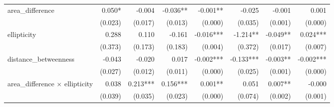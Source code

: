 \begin{tabular}{lrrrrrrr}
area\_difference                           &                       0.050* &                     -0.004 &                     -0.036** &                         -0.001** &                         -0.025 &                                                            -0.001 &                                               0.001 \\ 
                                           &                      (0.023) &                    (0.017) &                      (0.013) &                          (0.000) &                        (0.035) &                                                           (0.001) &                                             (0.000) \\ 
ellipticity                                &                        0.288 &                      0.110 &                       -0.161 &                        -0.016*** &                       -1.214** &                                                          -0.049** &                                            0.024*** \\ 
                                           &                      (0.373) &                    (0.173) &                      (0.183) &                          (0.004) &                        (0.372) &                                                           (0.017) &                                             (0.007) \\ 
distance\_betweenness                      &                       -0.043 &                     -0.020 &                        0.017 &                        -0.002*** &                      -0.133*** &                                                          -0.003** &                                           -0.002*** \\ 
                                           &                      (0.027) &                    (0.012) &                      (0.011) &                          (0.000) &                        (0.025) &                                                           (0.001) &                                             (0.000) \\ 
area\_difference $\times$ ellipticity      &                        0.038 &                   0.213*** &                     0.156*** &                          0.001** &                          0.051 &                                                           0.007** &                                              -0.000 \\ 
                                           &                      (0.039) &                    (0.035) &                      (0.023) &                          (0.000) &                        (0.074) &                                                           (0.002) &                                             (0.001) \\ 

\end{tabular}
